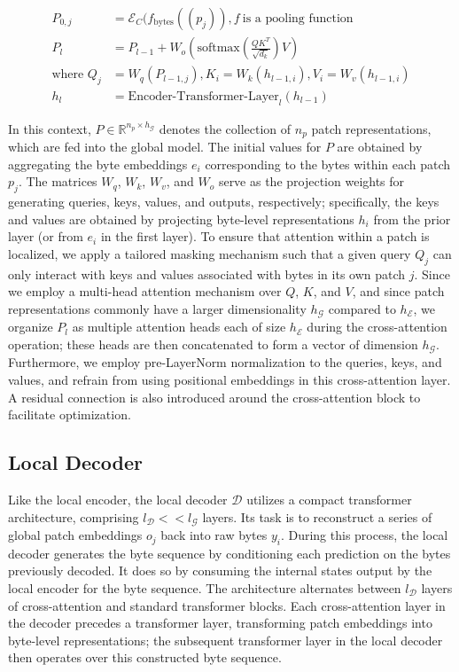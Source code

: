 \begin{align}
P_{0,j} &= \mathcal{E}_{C}(f_\text{bytes}((p_j)), f~ \text{is a pooling function} \\
P_l &= P_{l-1} + W_o\left(\text{softmax}\left(\frac{QK^T}{\sqrt{d_k}}\right)V\right) \\
\text{where } Q_j &= W_q(P_{l-1,j}), K_i = W_k(h_{l-1,i}), V_i = W_v(h_{l-1,i}) \\
h_l &= \text{Encoder-Transformer-Layer}_l(h_{l-1})
\end{align}

In this context, $P \in \mathbb{R}^{n_p \times h_{\mathcal{G}}}$ denotes the collection of $n_p$ patch representations, which are fed into the global model. The initial values for $P$ are obtained by aggregating the byte embeddings $e_i$ corresponding to the bytes within each patch $p_j$. The matrices $W_q$, $W_k$, $W_v$, and $W_o$ serve as the projection weights for generating queries, keys, values, and outputs, respectively; specifically, the keys and values are obtained by projecting byte-level representations $h_i$ from the prior layer (or from $e_i$ in the first layer). To ensure that attention within a patch is localized, we apply a tailored masking mechanism such that a given query $Q_j$ can only interact with keys and values associated with bytes in its own patch $j$. Since we employ a multi-head attention mechanism over $Q$, $K$, and $V$, and since patch representations commonly have a larger dimensionality $h_{\mathcal{G}}$ compared to $h_{\mathcal{E}}$, we organize $P_l$ as multiple attention heads each of size $h_{\mathcal{E}}$ during the cross-attention operation; these heads are then concatenated to form a vector of dimension $h_{\mathcal{G}}$. Furthermore, we employ pre-LayerNorm normalization to the queries, keys, and values, and refrain from using positional embeddings in this cross-attention layer. A residual connection is also introduced around the cross-attention block to facilitate optimization.

\subsection{Local Decoder} 

Like the local encoder, the local decoder $\mathcal{D}$ utilizes a compact transformer architecture, comprising $l_{\mathcal{D}} << l_{\mathcal{G}}$ layers. Its task is to reconstruct a series of global patch embeddings $o_j$ back into raw bytes $y_i$. During this process, the local decoder generates the byte sequence by conditioning each prediction on the bytes previously decoded. It does so by consuming the internal states output by the local encoder for the byte sequence. The architecture alternates between $l_{\mathcal{D}}$ layers of cross-attention and standard transformer blocks. Each cross-attention layer in the decoder precedes a transformer layer, transforming patch embeddings into byte-level representations; the subsequent transformer layer in the local decoder then operates over this constructed byte sequence.


